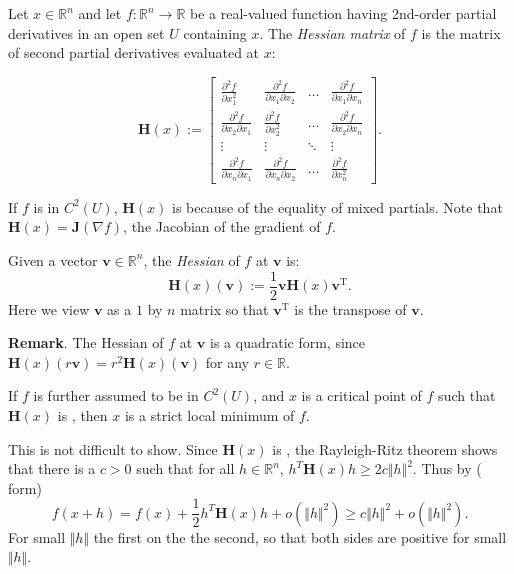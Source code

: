\documentclass[12pt]{article}
\begin{document}
Let $x \in \mathbb{R}^n$ and let $f\colon\mathbb{R}^n\to\mathbb{R}$ be a real-valued function having 2nd-order partial derivatives in an open set $U$ containing $x$.  The \emph{Hessian matrix} of $f$ is the matrix of second partial derivatives evaluated at $x$: 

\begin{equation}
\mathbf{H}(x):=
\begin{bmatrix}
\displaystyle{\frac{\partial^2 f}{\partial x_1^2}} & \displaystyle{\frac{\partial^2 f}{\partial x_1\partial x_2}} & \ldots & \displaystyle{\frac{\partial^2 f}{\partial x_1\partial x_n}}
\\ \displaystyle{\frac{\partial^2 f}{\partial x_2\partial x_1}} & \displaystyle{\frac{\partial^2 f}{\partial x_2^2}} & \ldots & \displaystyle{\frac{\partial^2 f}{\partial x_2\partial x_n}} 
\\ \vdots & \vdots & \ddots & \vdots
\\ \displaystyle{\frac{\partial^2 f}{\partial x_n\partial x_1}} & \displaystyle{\frac{\partial^2 f}{\partial x_n\partial x_2}} & \ldots & \displaystyle{\frac{\partial^2 f}{\partial x_n^2}}
\end{bmatrix}.
\end{equation}

If  $f$ is in $C^2(U)$, $\mathbf{H}(x)$ is  because of the equality of mixed partials.  Note that $\mathbf{H}(x)=\mathbf{J}(\nabla f)$, the Jacobian of the gradient of $f$.

Given  a vector $\boldsymbol{v}\in\mathbb{R}^n$, the \emph{Hessian} of $f$ at $\boldsymbol{v}$ is:
\begin{equation}
\mathbf{H}(x)(\boldsymbol{v}):=\frac{1}{2}\boldsymbol{v}\mathbf{H}(x)\boldsymbol{v}^{\operatorname{T}}.
\end{equation}
Here we view $\boldsymbol{v}$ as a $1$ by $n$ matrix so that $\boldsymbol{v}^{\operatorname{T}}$ is the transpose of $\boldsymbol{v}$.  

\textbf{Remark}.  The Hessian of $f$ at $\boldsymbol{v}$ is a quadratic form, since $\mathbf{H}(x)(r\boldsymbol{v})=r^2\mathbf{H}(x)(\boldsymbol{v})$ for any $r\in\mathbb{R}$. 

 If $f$ is further assumed to be in $C^2(U)$, and $x$ is a critical point of $f$ such that $\mathbf{H}(x)$ is , then 
$x$ is a strict local minimum of $f$.

This is not difficult to show. Since $\mathbf{H}(x)$ is , the Rayleigh-Ritz theorem shows that there is a  $c > 0$ such that for all $h \in \mathbb{R}^n$, 
$h^T\mathbf{H}(x)h \ge 2c \Vert h\Vert^2$. Thus by
 ( form)
$$
f(x + h ) = f(x) + \frac{1}{2} h^T\mathbf{H}(x)h + o(\Vert h \Vert^2) \ge c \Vert h \Vert^2 + o(\Vert h\Vert^2).$$
For small $\Vert h \Vert$ the first  on the  the second, so that both sides are positive for small $\Vert h\Vert$.
\end{document}
